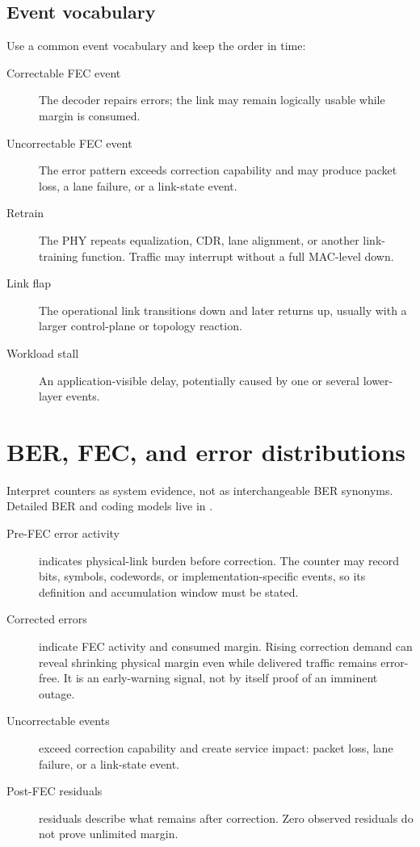 \subsection{Event vocabulary}
\label{sec:networking-event-vocab}

Use a common event vocabulary and keep the order in time:

\begin{description}
\item[Correctable FEC event] The decoder repairs errors; the link may remain
      logically usable while margin is consumed.
\item[Uncorrectable FEC event] The error pattern exceeds correction capability
      and may produce packet loss, a lane failure, or a link-state event.
\item[Retrain] The PHY repeats equalization, CDR, lane alignment, or another
      link-training function. Traffic may interrupt without a full MAC-level
      down.
\item[Link flap] The operational link transitions down and later returns up,
      usually with a larger control-plane or topology reaction.
\item[Workload stall] An application-visible delay, potentially caused by one
      or several lower-layer events.
\end{description}


\section{BER, FEC, and error distributions}
\label{sec:fec-symbol-histogram}

Interpret counters as system evidence, not as interchangeable BER synonyms.
Detailed BER and coding models live in .

\begin{description}
\item[Pre-FEC error activity]
       indicates physical-link burden before correction. The
      counter may record bits, symbols, codewords, or implementation-specific
      events, so its definition and accumulation window must be stated.
\item[Corrected errors]
       indicate FEC activity and consumed margin.
      Rising correction demand can reveal shrinking physical margin even while
      delivered traffic remains error-free. It is an early-warning signal, not
      by itself proof of an imminent outage.
\item[Uncorrectable events]
      exceed correction capability and create service impact: packet loss, lane
      failure, or a link-state event.
\item[Post-FEC residuals]
       residuals describe what remains after correction. Zero
      observed residuals do not prove unlimited margin.
\end{description}


